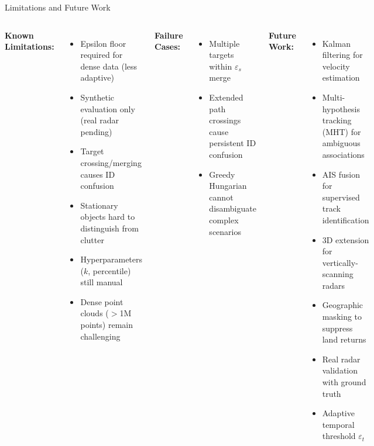 \documentclass[aspectratio=169, 10pt]{beamer}
\begin{document}
\begin{frame}{Limitations and Future Work}
\scriptsize
\begin{columns}[T]
\textbf{Known Limitations:}
\begin{itemize}
  \setlength{\itemsep}{0pt}
  \item \textcolor{Rose}{Epsilon floor required} for dense data (less adaptive)
  \item \textcolor{Rose}{Synthetic evaluation only} (real radar pending)
  \item \textcolor{Rose}{Target crossing/merging} causes ID confusion
  \item \textcolor{Rose}{Stationary objects} hard to distinguish from clutter
  \item \textcolor{Rose}{Hyperparameters} ($k$, percentile) still manual
  \item \textcolor{Rose}{Dense point clouds} ($>$1M points) remain challenging
\end{itemize}

\vspace{0.15cm}
\textbf{Failure Cases:}
\begin{itemize}
  \setlength{\itemsep}{0pt}
  \item Multiple targets within $\varepsilon_s$ merge
  \item Extended path crossings cause persistent ID confusion
  \item Greedy Hungarian cannot disambiguate complex scenarios
\end{itemize}

\textbf{Future Work:}
\begin{itemize}
  \setlength{\itemsep}{0pt}
  \item \textcolor{Congaree}{Kalman filtering} for velocity estimation
  \item \textcolor{Congaree}{Multi-hypothesis tracking} (MHT) for ambiguous associations
  \item \textcolor{Congaree}{AIS fusion} for supervised track identification
  \item \textcolor{Congaree}{3D extension} for vertically-scanning radars
  \item \textcolor{Congaree}{Geographic masking} to suppress land returns
  \item \textcolor{Congaree}{Real radar validation} with ground truth
  \item \textcolor{Congaree}{Adaptive temporal threshold} $\varepsilon_t$
\end{itemize}


\end{columns}
\end{frame}
\end{document}
